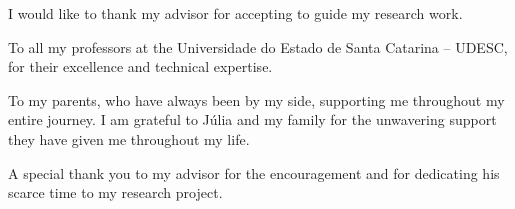 \begin{agradecimentos}
I would like to thank my advisor for accepting to guide my research work.

To all my professors at the Universidade do Estado de Santa Catarina – UDESC, for their excellence and technical expertise.

To my parents, who have always been by my side, supporting me throughout my entire journey. I am grateful to Júlia and my family for the unwavering support they have given me throughout my life.

A special thank you to my advisor for the encouragement and for dedicating his scarce time to my research project.


\end{agradecimentos}
